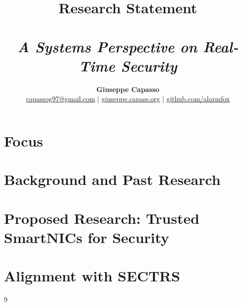 \documentclass[11pt,a4paper]{article}
\title{
    \vspace{-1in}
    \large \textbf{Research Statement}\\
    \huge \textbf{}\\
    \large \textit{A Systems Perspective on Real-Time Security}
}
\author{\textbf{Giuseppe Capasso} \\ \href{mailto:capassog97@gmail.com}{capassog97@gmail.com} | \href{https://giuseppe.capass.org}{giuseppe.capass.org} | \href{https://github.com/alarmfox}{github.com/alarmfox}}
\date{}
\begin{document}
\maketitle

\section{Focus}

\section{Background and Past Research}

\section{Proposed Research: Trusted SmartNICs for Security}
\section{Alignment with SECTRS}

\begin{thebibliography}{9}
\end{thebibliography}
\end{document}
